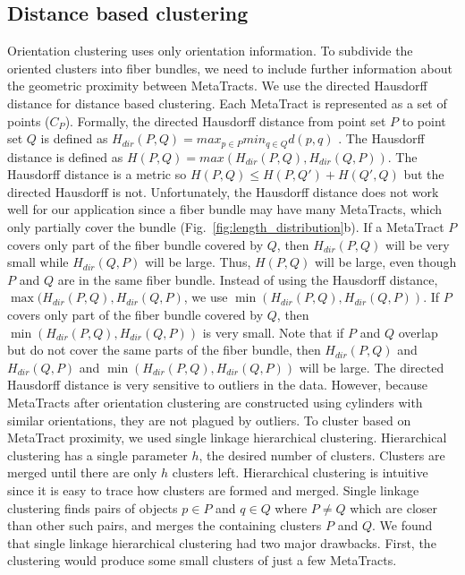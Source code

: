   
\subsection{Distance based clustering}
 \label{subsec:dist_clustering}
Orientation clustering uses only orientation information. To subdivide the oriented clusters into fiber bundles, we need to include further information about the geometric proximity between MetaTracts. We use the directed Hausdorff distance for distance based clustering.
Each MetaTract is represented as a set of points ($C_P$). Formally, the directed Hausdorff distance from point set $P$ to point set $Q$ is defined as 
$H_{dir}(P,Q) = max_{p \in P} min_{q \in Q} d(p,q)$ .
The Hausdorff distance is defined as $H(P,Q) = max(H_{dir}(P,Q),H_{dir}(Q,P))$.
The Hausdorff distance is a metric so $H(P,Q) \le H(P,Q') + H(Q',Q)$ but the directed Hausdorff is not.
%
Unfortunately, the Hausdorff distance does not work well for our application since a fiber bundle may have many MetaTracts, which only partially cover the bundle (Fig.~\ref{fig:length_distribution}b). If a MetaTract $P$ covers only part of the fiber bundle covered by $Q$, then $H_{dir}(P,Q)$ will be very small while $H_{dir}(Q,P)$ will be large.
%
Thus, $H(P,Q)$ will be large, even though $P$ and $Q$ are in the same fiber bundle.
Instead of using the Hausdorff distance, $\max(H_{dir}(P,Q),H_{dir}(Q,P)$, we use $\min(H_{dir}(P,Q),H_{dir}(Q,P))$. If $P$ covers only part of the fiber bundle covered by $Q$, then $\min(H_{dir}(P,Q),H_{dir}(Q,P))$ is very small.
Note that if $P$ and $Q$ overlap but do not cover the same parts of the fiber bundle, then $H_{dir}(P,Q)$ and $H_{dir}(Q,P)$ and $\min(H_{dir}(P,Q),H_{dir}(Q,P))$ will be large.
% 
The directed Hausdorff distance is very sensitive to outliers in the data.
However, because MetaTracts after orientation clustering are constructed using cylinders with similar orientations, they are not plagued by outliers.
To cluster based on MetaTract proximity, we used single linkage hierarchical clustering.
Hierarchical clustering has a single parameter $h$, the desired number of clusters.
Clusters are merged until there are only $h$ clusters left.
Hierarchical clustering is intuitive since it is easy to trace how clusters are formed and merged.
Single linkage clustering finds pairs of objects $p \in P$ and $q \in Q$ where $P \neq Q$ which are closer than other such pairs, and merges the containing clusters $P$ and $Q$.
We found that single linkage hierarchical clustering had two major drawbacks.
First, the clustering would produce some small clusters of just a few MetaTracts.
